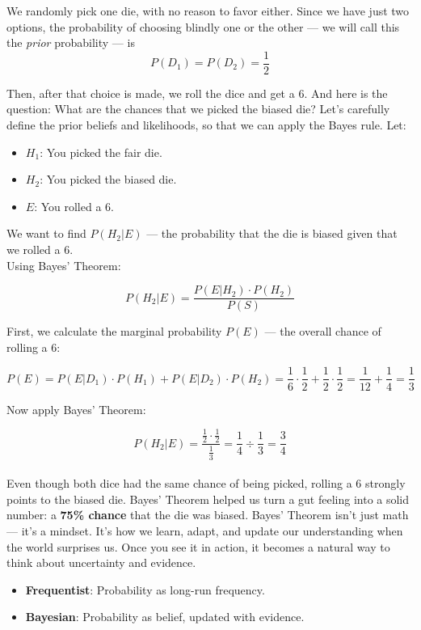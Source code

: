\documentclass{book}
\begin{document}
We randomly pick one die, with no reason to favor either. Since we have just two options, the probability of choosing blindly one or the other — we will call this the \textit{prior} probability — is
\[
P(D_1) = P(D_2) = \frac{1}{2}
\]

Then, after that choice is made, we roll the dice and get a 6. And here is the question: What are the chances that we picked the biased die? Let's carefully define the prior beliefs and likelihoods, so that we can apply the Bayes rule. Let:

\begin{itemize}
  \item $H_1$: You picked the fair die.
  \item $H_2$: You picked the biased die.
  \item $E$: You rolled a 6.
\end{itemize}

We want to find $P(H_2 | E)$ — the probability that the die is biased given that we rolled a 6.\\

Using Bayes’ Theorem:

\[
P(H_2 | E) = \frac{P(E | H_2) \cdot P(H_2)}{P(S)}
\]

First, we calculate the marginal probability $P(E)$ — the overall chance of rolling a 6:

\[
P(E) = P(E | D_1) \cdot P(H_1) + P(E | D_2) \cdot P(H_2) = \frac{1}{6} \cdot \frac{1}{2} + \frac{1}{2} \cdot \frac{1}{2}
= \frac{1}{12} + \frac{1}{4} = \frac{1}{3}
\]

Now apply Bayes' Theorem:

\[
P(H_2 | E) = \frac{\frac{1}{2} \cdot \frac{1}{2}}{\frac{1}{3}} = \frac{1}{4} \div \frac{1}{3} = \frac{3}{4}
\]\\

Even though both dice had the same chance of being picked, rolling a 6 strongly points to the biased die. Bayes’ Theorem helped us turn a gut feeling into a solid number: a \textbf{75\% chance} that the die was biased. Bayes’ Theorem isn’t just math — it’s a mindset. It’s how we learn, adapt, and update our understanding when the world surprises us. Once you see it in action, it becomes a natural way to think about uncertainty and evidence.

\begin{itemize}
    \item \textbf{Frequentist}: Probability as long-run frequency.
    \item \textbf{Bayesian}: Probability as belief, updated with evidence.
\end{itemize}
\end{document}
